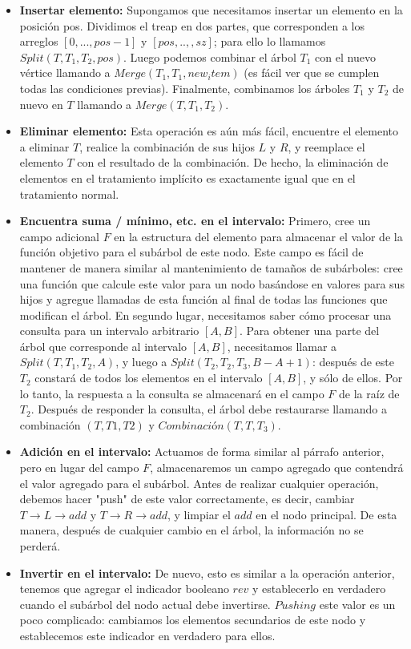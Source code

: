 \documentclass[12pt]{article}
\begin{document}
\begin{itemize}
	\item \textbf{Insertar elemento:} Supongamos que necesitamos insertar un elemento en la posición pos. Dividimos el treap en dos partes, que corresponden a los arreglos $[0, ..., pos-1]$ y $[pos, .., , sz]$; para ello lo llamamos $Split(T, T_1, T_2, pos)$. Luego podemos combinar el árbol $T_1$ con el nuevo vértice llamando a $Merge(T_1, T_1, new_item)$ (es fácil ver que se cumplen todas las condiciones previas). Finalmente, combinamos los árboles $T_1$ y $T_2$ de nuevo en $T$ llamando a $Merge(T, T_1, T_2)$.
	\item \textbf{Eliminar elemento:} Esta operación es aún más fácil, encuentre el elemento a eliminar $T$, realice la combinación de sus hijos $L$ y $R$, y reemplace el elemento $T$ con el resultado de la combinación. De hecho, la eliminación de elementos en el tratamiento implícito es exactamente igual que en el tratamiento normal.
	\item \textbf{Encuentra suma / mínimo, etc. en el intervalo:} Primero, cree un campo adicional $F$ en la estructura del elemento para almacenar el valor de la función objetivo para el subárbol de este nodo. Este campo es fácil de mantener de manera similar al mantenimiento de tamaños de subárboles: cree una función que calcule este valor para un nodo basándose en valores para sus hijos y agregue llamadas de esta función al final de todas las funciones que modifican el árbol.
	En segundo lugar, necesitamos saber cómo procesar una consulta para un intervalo arbitrario $[A, B]$. Para obtener una parte del árbol que corresponde al intervalo $[A, B]$, necesitamos llamar a $Split(T, T_1, T_2, A)$, y luego a $Split(T_2, T_2, T_3, B - A + 1)$: después de este $T_2$ constará de todos los elementos en el intervalo $[A, B]$, y sólo de ellos. Por lo tanto, la respuesta a la consulta se almacenará en el campo $F$ de la raíz de $T_2$. Después de responder la consulta, el árbol debe restaurarse llamando a combinación $(T, T1, T2)$ y $Combinación(T, T, T_3)$.
	\item \textbf{Adición en el intervalo:} Actuamos de forma similar al párrafo anterior, pero en lugar del campo $F$, almacenaremos un campo agregado que contendrá el valor agregado para el subárbol. Antes de realizar cualquier operación, debemos hacer "push" de este valor correctamente, es decir, cambiar $T \rightarrow L \rightarrow add$ y $T \rightarrow R \rightarrow add$, y limpiar el $add$ en el nodo principal. De esta manera, después de cualquier cambio en el árbol, la información no se perderá.
	\item \textbf{Invertir en el intervalo:} De nuevo, esto es similar a la operación anterior, tenemos que agregar el indicador booleano $rev$ y establecerlo en verdadero cuando el subárbol del nodo actual debe invertirse. $Pushing$ este valor es un poco complicado: cambiamos los elementos secundarios de este nodo y establecemos este indicador en verdadero para ellos.
\end{itemize}
\end{document}
